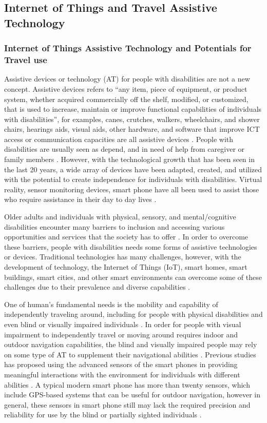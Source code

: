 \subsection{Internet of Things and Travel Assistive Technology}
\subsubsection{Internet of Things Assistive Technology and Potentials for Travel use}
Assistive devices or technology (AT) for people with disabilities are not a new concept. 
Assistive devices refers to ``any item, piece of equipment, or product system, 
whether acquired commercially off the shelf, modified, or customized, that is used 
to increase, maintain or improve functional capabilities of individuals with 
disabilities'', for examples, canes, crutches, walkers, wheelchairs, and shower 
chairs, hearings aids, visual aids, other hardware, and software that improve 
ICT access or communication capacities are all assistive devices \cite{Barbeau, Shah}. 
People with disabilities are usually seen as depend, and in need of help from
caregiver or family members \cite{YE20096527}. However, with the technological growth that has 
been seen in the last 20 years, a wide array of devices have been adapted, 
created, and utilized with the potential to create independence for individuals 
with disabilities. Virtual reality, sensor monitoring devices, smart phone have 
all been used to assist those who require assistance in their day to day 
lives \cite{moya2016dynamic}.  

Older adults and individuals with physical, sensory, and mental/cognitive 
disabilities encounter many barriers to inclusion and accessing various 
opportunities and services that the society has to offer \cite{Shah}. 
In order to overcome these barriers, people with disabilities needs some 
forms of assistive technologies or devices. Traditional technologies has 
many challenges, however,  with the development of technology, the 
Internet of Things (IoT), smart homes, smart buildings,
smart cities, and other smart environments can overcome some of 
these challenges due to their prevalence and diverse capabilities \cite{Farm}.

One of human's fundamental needs is the mobility and capability of 
independently traveling around, including for people with physical 
disabilities and even blind or visually impaired individuals \cite{Barbeau}.
In order for people with visual impairment to independently travel or 
moving around requires indoor and outdoor navigation capabilities, the 
blind and visually impaired people may rely on some type of AT to 
supplement their navigational abilities \cite{Shah}. Previous studies has 
proposed using the advanced sensors of the smart phones in providing 
meaningful interactions with the environment for individuals 
with different abilities \cite{Shah}. A typical modern smart phone 
has more than twenty sensors, which include GPS-based systems that 
can be useful for outdoor navigation, however in general, these 
sensors in smart phone still may lack the required precision 
and reliability for use by the blind or partially sighted individuals \cite{Shah}. 

